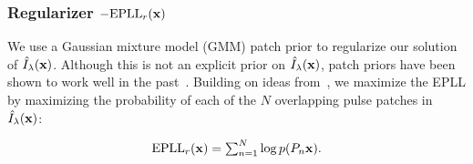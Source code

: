 {{\subsubsection{Regularizer $- \mbox{EPLL}_r({\bf x})$ }


We use a Gaussian mixture model (GMM) patch prior to regularize our solution of $\hat{I}_{\lambda}({\bf x})$. Although this is not an explicit prior on $\hat{I}_{\lambda}({\bf x})$, patch priors have been shown to work well 
in the past~\cite{zoran2011learning, zoran2012natural}.  Building on ideas from~\cite{zoran2011learning}, we maximize the EPLL by maximizing the probability of each of the $N$ overlapping pulse patches in $\hat{I}_{\lambda}({\bf x})$:

\vspace{-.15in}
\begin{align}
\mbox{EPLL}_r({\bf x}) = \textstyle \sum_{n=1}^N  \log p(P_n {\bf x}).
\end{align}
\vspace{-.15in}








}}
